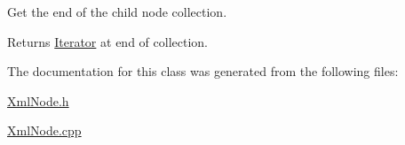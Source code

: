 Get the end of the child node collection. 

\begin{DoxyReturn}{Returns}
\mbox{\hyperlink{classxmlnode_1_1_c_xml_node_1_1_iterator}{Iterator}} at end of collection. 
\end{DoxyReturn}


The documentation for this class was generated from the following files\+:\begin{DoxyCompactItemize}
\item 
\mbox{\hyperlink{_xml_node_8h}{Xml\+Node.\+h}}\item 
\mbox{\hyperlink{_xml_node_8cpp}{Xml\+Node.\+cpp}}\end{DoxyCompactItemize}
